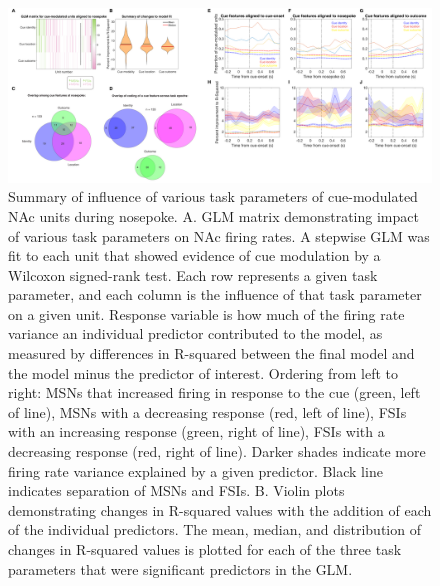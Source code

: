 \documentclass[11pt]{article}
\begin{document}
\begin{figure}[h]
\centering
\includegraphics[width=\textwidth]{Fig 10 - NP GLM.png}
\caption{Summary of influence of various task parameters of cue-modulated NAc units during nosepoke. A. GLM matrix demonstrating impact of various task parameters on NAc firing rates. A stepwise GLM was fit to each unit that showed evidence of cue modulation by a Wilcoxon signed-rank test. Each row represents a given task parameter, and each column is the influence of that task parameter on a given unit. Response variable is how much of the firing rate variance an individual predictor contributed to the model, as measured by differences in R-squared between the final model and the model minus the predictor of interest. Ordering from left to right: MSNs that increased firing in response to the cue (green, left of line), MSNs with a decreasing response (red, left of line), FSIs with an increasing response (green, right of line), FSIs with a decreasing response (red, right of line). Darker shades indicate more firing rate variance explained by a given predictor. Black line indicates separation of MSNs and FSIs. B. Violin plots demonstrating changes in R-squared values with the addition of each of the individual predictors. The mean, median, and distribution of changes in R-squared values is plotted for each of the three task parameters that were significant predictors in the GLM.}
\label{fig:NP_GLM}
\end{figure}
\end{document}
